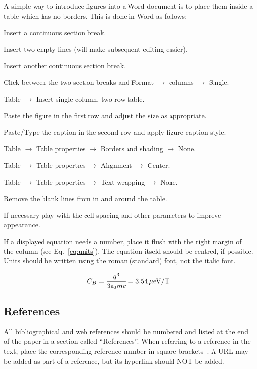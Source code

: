 \documentclass{JAC2003}
\begin{document}
A simple way to introduce figures into a Word document is to place them inside a table which has no borders. This is done in Word as follows:
\begin{Itemize}
\item	Insert a continuous section break.
\item	Insert two empty lines (will make subsequent editing easier).
\item	Insert another continuous section break.
\item	Click between the two section breaks and Format $\rightarrow$ columns $\rightarrow$ Single.
\item	Table $\rightarrow$ Insert single column, two row table.
\item	Paste the figure in the first row and adjust the size as appropriate.
\item	Paste/Type the caption in the second row and apply figure caption style.
\item	Table $\rightarrow$ Table properties $\rightarrow$ Borders and shading $\rightarrow$ None.
\item	Table $\rightarrow$ Table properties $\rightarrow$ Alignment $\rightarrow$ Center.
\item	Table $\rightarrow$ Table properties $\rightarrow$ Text wrapping $\rightarrow$ None.
\item	Remove the blank lines from in and around the table.
\item	If necessary play with the cell spacing and other parameters to improve appearance.
\end{Itemize}

If a displayed equation needs a number, place it flush with the right
margin of the column (see Eq.~\ref{eq:units}). The equation itseld should be centred, if possible.
Units should be written
using the roman (standard) font, not the italic font.

\begin{equation}\label{eq:units}
    C_B={q^3\over 3\epsilon_{0} mc}=3.54\,\hbox{$\mu$eV/T}
\end{equation}

\subsection{References}

All bibliographical and web references should be numbered and listed at the
end of the paper in a section called ``References''. When referring to a
reference in the text, place the corresponding reference number in square
brackets~\cite{exampl-ref}. A URL may be added as part of a reference, but 
its hyperlink should NOT be added.
\end{document}
